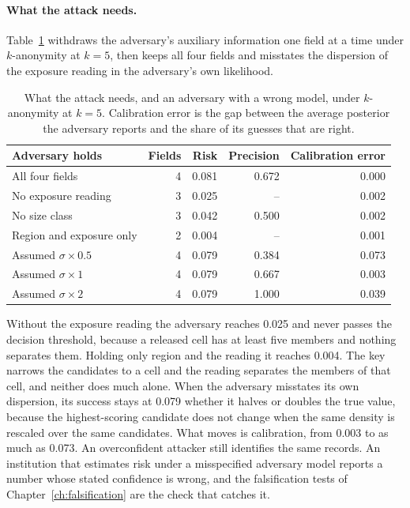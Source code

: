 \paragraph{What the attack needs.} Table~\ref{c13:tab-ablation} withdraws the
adversary's auxiliary information one field at a time under $k$-anonymity at $k=5$,
then keeps all four fields and misstates the dispersion of the exposure reading in
the adversary's own likelihood.

\begin{table}[ht]
\centering
\caption{What the attack needs, and an adversary with a wrong model, under
$k$-anonymity at $k=5$. Calibration error is the gap between the average posterior
the adversary reports and the share of its guesses that are right.}
\label{c13:tab-ablation}
\small
\begin{tabular}{lrrrr}
\toprule
Adversary holds & Fields & Risk & Precision & Calibration error \\
\midrule
All four fields             & 4 & 0.081 & 0.672 & 0.000 \\
No exposure reading         & 3 & 0.025 & --    & 0.002 \\
No size class               & 3 & 0.042 & 0.500 & 0.002 \\
Region and exposure only    & 2 & 0.004 & --    & 0.001 \\
\midrule
Assumed $\sigma \times 0.5$ & 4 & 0.079 & 0.384 & 0.073 \\
Assumed $\sigma \times 1$   & 4 & 0.079 & 0.667 & 0.003 \\
Assumed $\sigma \times 2$   & 4 & 0.079 & 1.000 & 0.039 \\
\bottomrule
\end{tabular}
\end{table}

Without the exposure reading the adversary reaches 0.025 and never passes the
decision threshold, because a released cell has at least five members and nothing
separates them. Holding only region and the reading it reaches 0.004. The key narrows
the candidates to a cell and the reading separates the members of that cell, and
neither does much alone. When the adversary misstates its own dispersion, its success
stays at 0.079 whether it halves or doubles the true value, because the
highest-scoring candidate does not change when the same density is rescaled over the
same candidates. What moves is
calibration, from 0.003 to as much as 0.073.
An overconfident attacker still identifies the same records. An institution that
estimates risk under a misspecified adversary model reports a number whose stated
confidence is wrong, and the falsification tests of Chapter~\ref{ch:falsification}
are the check that catches it.


